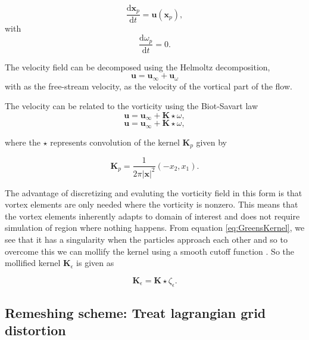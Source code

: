 \begin{equation}
\frac{\mathrm{d}\mathbf{x}_p}{\mathrm{d}t} = \mathbf{u}\left(\mathbf{x}_p\right),
\end{equation}
with
\begin{equation}
\frac{\mathrm{d}\omega_p}{\mathrm{d}t} = 0.
\end{equation}

The velocity field can be decomposed using the Helmoltz decomposition,
\begin{equation}
\mathbf{u} = \mathbf{u}_{\infty} + \mathbf{u}_{\omega}
\end{equation}
with  as the free-stream velocity,  as the velocity of the vortical part of the flow.


The velocity can be related to the vorticity using the Biot-Savart law
\begin{equation}
\mathbf{u} = \mathbf{u}_{\infty} + \mathbf{K}\star\omega,
\end{equation}
\begin{equation}
\mathbf{u} = \mathbf{u}_{\infty} + \mathbf{K}\star\omega,
\end{equation}

where the $\star$ represents convolution of the kernel $\mathbf{K}_p$ given by

\begin{equation}
\mathbf{K}_p = \frac{1}{2\pi\left|\mathbf{x}\right|^2}\left(-x_2,x_1\right).
\label{eq:GreensKernel}
\end{equation}

The advantage of discretizing and evaluting the vorticity field in this form is that vortex elements are only needed where the vorticity is nonzero. This means that the vortex elements inherently adapts to domain of interest and does not require simulation of region where nothing happens. From equation \ref{eq:GreensKernel}, we see that it has a singularity when the particles approach each other and so to overcome this we can mollify the kernel using a smooth cutoff function . So the mollified kernel $\mathbf{K}_{\epsilon}$ is given as 

\begin{equation}
\mathbf{K}_{\epsilon} = \mathbf{K} \star \zeta_{\epsilon}.
\end{equation}

\subsection{Remeshing scheme: Treat lagrangian grid distortion}


